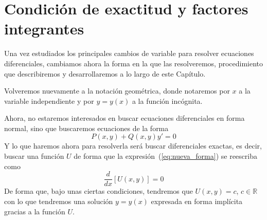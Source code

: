 \newpage
\chapter{Condición de exactitud y factores integrantes}
Una vez estudiados los principales cambios de variable para resolver ecuaciones diferenciales, cambiamos ahora la forma en la que las resolveremos, procedimiento que describiremos y desarrollaremos a lo largo de este Capítulo.

\begin{notacion}
    Volveremos nuevamente a la notación geométrica, donde notaremos por $x$ a la variable independiente y por $y = y(x)$ a la función incógnita.
\end{notacion}

Ahora, no estaremos interesados en buscar ecuaciones diferenciales en forma normal, sino que buscaremos ecuaciones de la forma
\begin{equation}\label{eq:nueva_forma}
    P(x,y) + Q(x,y)y' = 0
\end{equation}
Y lo que haremos ahora para resolverla será buscar diferenciales exactas, es decir, buscar una función $U$ de forma que la expresión~(\ref{eq:nueva_forma}) se reescriba como
\begin{equation*}
    \dfrac{d}{dx}[U(x,y)] = 0
\end{equation*}
De forma que, bajo unas ciertas condiciones, tendremos que $U(x,y)= c$, $c\in \mathbb{R}$ con lo que tendremos una solución $y=y(x)$ expresada en forma implícita gracias a la función $U$.

